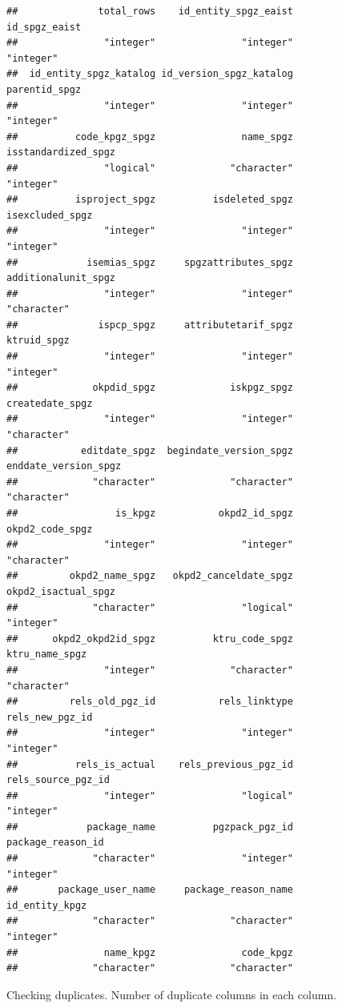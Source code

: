 \documentclass[
]{article}
\begin{document}
\begin{verbatim}
##              total_rows    id_entity_spgz_eaist           id_spgz_eaist 
##               "integer"               "integer"               "integer" 
##  id_entity_spgz_katalog id_version_spgz_katalog           parentid_spgz 
##               "integer"               "integer"               "integer" 
##          code_kpgz_spgz               name_spgz     isstandardized_spgz 
##               "logical"             "character"               "integer" 
##          isproject_spgz          isdeleted_spgz         isexcluded_spgz 
##               "integer"               "integer"               "integer" 
##            isemias_spgz     spgzattributes_spgz     additionalunit_spgz 
##               "integer"               "integer"             "character" 
##              ispcp_spgz     attributetarif_spgz             ktruid_spgz 
##               "integer"               "integer"               "integer" 
##             okpdid_spgz             iskpgz_spgz         createdate_spgz 
##               "integer"               "integer"             "character" 
##           editdate_spgz  begindate_version_spgz    enddate_version_spgz 
##             "character"             "character"             "character" 
##                 is_kpgz           okpd2_id_spgz         okpd2_code_spgz 
##               "integer"               "integer"             "character" 
##         okpd2_name_spgz   okpd2_canceldate_spgz     okpd2_isactual_spgz 
##             "character"               "logical"               "integer" 
##      okpd2_okpd2id_spgz          ktru_code_spgz          ktru_name_spgz 
##               "integer"             "character"             "character" 
##         rels_old_pgz_id           rels_linktype         rels_new_pgz_id 
##               "integer"               "integer"               "integer" 
##          rels_is_actual    rels_previous_pgz_id      rels_source_pgz_id 
##               "integer"               "logical"               "integer" 
##            package_name          pgzpack_pgz_id       package_reason_id 
##             "character"               "integer"               "integer" 
##       package_user_name     package_reason_name          id_entity_kpgz 
##             "character"             "character"               "integer" 
##               name_kpgz               code_kpgz 
##             "character"             "character"
\end{verbatim}

Checking duplicates. Number of duplicate columns in each column.
\end{document}

